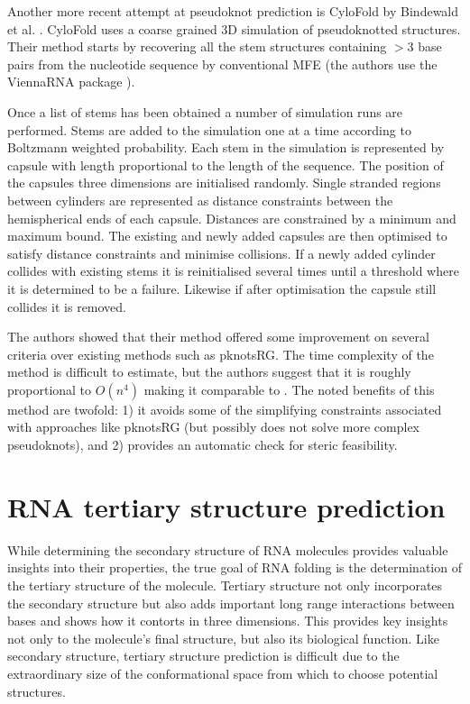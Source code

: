 \documentclass[journal]{IEEEtran}
\begin{document}
Another more recent attempt at pseudoknot prediction is CyloFold by Bindewald et al. \cite{bindewald2010cylofold}. CyloFold uses a coarse grained 3D simulation of pseudoknotted structures. Their method starts by recovering all the stem structures containing $>3$ base pairs from the nucleotide sequence by conventional MFE (the authors use the ViennaRNA package \cite{lorenz2011viennarna}). 

Once a list of stems has been obtained a number of simulation runs are performed. Stems are added to the simulation one at a time according to Boltzmann weighted probability. Each stem in the simulation is represented by capsule with length proportional to the length of the sequence. The position of the capsules three dimensions are initialised randomly. Single stranded regions between cylinders are represented as distance constraints between the hemispherical ends of each capsule. Distances are constrained by a minimum and maximum bound. The existing and newly added capsules are then optimised to satisfy distance constraints and minimise collisions. If a newly added cylinder collides with existing stems it is reinitialised several times until a threshold where it is determined to be a failure. Likewise if after optimisation the capsule still collides it is removed.

The authors showed that their method offered some improvement on several criteria over existing methods such as pknotsRG. The time complexity of the method is difficult to estimate, but the authors suggest that it is roughly proportional to $O(n^4)$ making it comparable to \cite{reeder2007pknotsrg}. The noted benefits of this method are twofold: 1) it avoids some of the simplifying constraints associated with approaches like pknotsRG (but possibly does not solve more complex pseudoknots), and 2) provides an automatic check for steric feasibility.



\section{RNA tertiary structure prediction}
\label{sec:rna-tertiary-structure}
While determining the secondary structure of RNA molecules provides valuable insights into their properties, the true goal of RNA folding is the determination of the tertiary structure of the molecule. Tertiary structure not only incorporates the secondary structure but also adds important long range interactions between bases and shows how it contorts in three dimensions. This provides key insights not only to the molecule's final structure, but also its biological function. Like secondary structure, tertiary structure prediction is difficult due to the extraordinary size of the conformational space from which to choose potential structures. 
\end{document}
